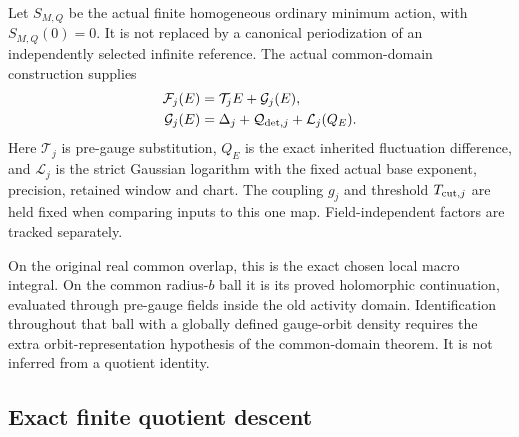 Let $S_{M,Q}$ be the actual finite homogeneous ordinary minimum
action, with $S_{M,Q}(0)=0$. It is not replaced by a canonical
periodization of an independently selected infinite reference.
The actual common-domain construction supplies
\begin{align}
 \mathcal F_j(E)&=\mathcal T_jE+\mathcal G_j(E),\notag\\
 \mathcal G_j(E)&=\Delta_j+\mathcal Q_{{\rm det},j}
                                      +\mathcal L_j(Q_E).
 \label{fqi-map}
\end{align}
Here $\mathcal T_j$ is pre-gauge substitution, $Q_E$ is the exact
inherited fluctuation difference, and $\mathcal L_j$ is the
strict Gaussian logarithm with the fixed actual base exponent,
precision, retained window and chart. The coupling $g_j$ and
threshold $T_{{\rm cut},j}$ are held fixed when comparing inputs
to this one map. Field-independent factors are tracked separately.

On the original real common overlap, this is the exact chosen
local macro integral. On the common radius-$b$ ball it is its
proved holomorphic continuation, evaluated through pre-gauge
fields inside the old activity domain. Identification throughout
that ball with a globally defined gauge-orbit density requires
the extra orbit-representation hypothesis of the common-domain
theorem. It is not inferred from a quotient identity.

\subsection{Exact finite quotient descent}
\label{fqi-descent-section}

